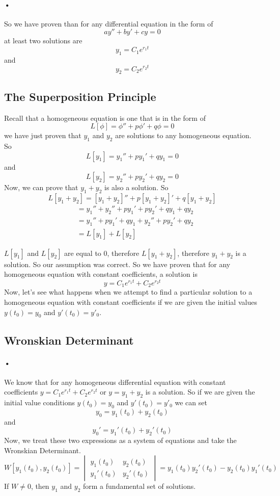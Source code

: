 \documentclass[font =22]{report}
\begin{document}
\paragraph{•} 
So we have proven than for any differential equation in the form of 
\[
ay''+by'+cy = 0
\]
at least two solutions are
\[
y_1 = C_1 e^{r_1t}
\]
and
\[
y_2 = C_2e^{r_2t}
\]

\subsection{The Superposition Principle}
Recall that a homogeneous equation is one that is in the form of 
\[
L[\phi] = \phi'' + p\phi' +q\phi= 0
\] 
we have just proven that $y_1$ and $y_2$ are solutions to any homogeneous equation. So 
\[
L[y_1] = y_1'' +py_1'+qy_1 = 0
\]
and 
\[
L[y_2] = y_2''+py_2'+qy_2 = 0
\]
Now, we can prove that $y_1+y_2$ is also a solution. So
\begin{equation*}
L[y_1+y_2] = [y_1+y_2]'' + p[y_1+y_2 ]' + q [y_1+y_2]
\end{equation*}
\begin{align*}
 &= y_1''+y_2'' + py_1'+py_2' + qy_1+qy_2 \\
 &= y_1''+ py_1'+qy_1+y_2''+py_2'+qy_2 \\
  &= L[y_1]+ L[y_2]
\end{align*}

$L[y_1]$ and $L[y_2]$ are equal to $0$, therefore $L[y_1+y_2]$, therefore $y_1+y_2$ is a solution. So our assumption was correct.
So we have proven that for any homogeneous equation with constant coefficients, a solution is 
\[
y = C_1 e^{r_1t}+C_2e^{r_2t}
\] 
 Now, let's see what happens when we attempt to find a particular solution to a homogeneous equation with constant coefficients if we are given the initial values $y(t_0) = y_0$ and $y'(t_0) = y'_0$. 
 \subsection{Wronskian Determinant}
 \paragraph{•}
 We know that for any homogeneous differential equation with constant coefficients $y = C_1 e^{r_1t}+C_2e^{r_2t}$ or $y = y_1 + y_2$ is a solution. So if we are given the initial value conditions $y(t_0) = y_0$ and $y'(t_0) = y'_0$ we can set 
 \[
 y_0 = y_1(t_0) + y_2(t_0)
 \]
 and
 \[
 y_0' = y_1'(t_0) + y_2'(t_0)
 \]
 Now, we treat these two expressions as a system of equations and take the Wronskian Determinant. 
 \[
 W[y_1(t_0),y_2(t_0)] =
 \begin{vmatrix}
 y_1(t_0) & y_2(t_0)\\
 y_1'(t_0) & y_2'(t_0)
 \end{vmatrix} 
 = y_1(t_0)y_2'(t_0)-y_2(t_0)y_1'(t_0)
 \]
 If $W \neq 0 $, then $y_1$ and $y_2$ form a fundamental set of solutions.
\end{document}
